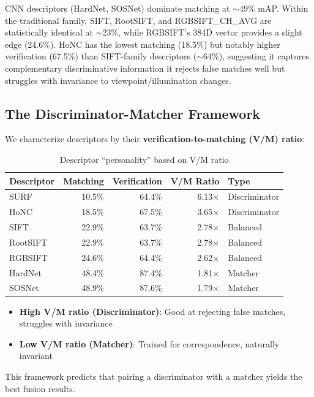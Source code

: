 CNN descriptors (HardNet, SOSNet) dominate matching at $\sim$49\% mAP\@. Within the traditional family, SIFT, RootSIFT, and RGBSIFT\_CH\_AVG are statistically identical at $\sim$23\%, while RGBSIFT's 384D vector provides a slight edge (24.6\%). HoNC has the lowest matching (18.5\%) but notably higher verification (67.5\%) than SIFT-family descriptors ($\sim$64\%), suggesting it captures complementary discriminative information it rejects false matches well but struggles with invariance to viewpoint/illumination changes.

\subsection{The Discriminator-Matcher Framework}

We characterize descriptors by their \textbf{verification-to-matching (V/M) ratio}:

\begin{table}[ht]
\centering
\caption{Descriptor ``personality'' based on V/M ratio}
\label{tab:vm_ratio}
\begin{tabular}{lrrrl}
\toprule
\textbf{Descriptor} & \textbf{Matching} & \textbf{Verification} & \textbf{V/M Ratio} & \textbf{Type} \\
\midrule
SURF & 10.5\% & 64.4\% & 6.13$\times$ & Discriminator \\
HoNC & 18.5\% & 67.5\% & 3.65$\times$ & Discriminator \\
SIFT & 22.9\% & 63.7\% & 2.78$\times$ & Balanced \\
RootSIFT & 22.9\% & 63.7\% & 2.78$\times$ & Balanced \\
RGBSIFT & 24.6\% & 64.4\% & 2.62$\times$ & Balanced \\
HardNet & 48.4\% & 87.4\% & 1.81$\times$ & Matcher \\
SOSNet & 48.9\% & 87.6\% & 1.79$\times$ & Matcher \\
\bottomrule
\end{tabular}
\end{table}

\begin{itemize}
    \item \textbf{High V/M ratio (Discriminator)}: Good at rejecting false matches, struggles with invariance
    \item \textbf{Low V/M ratio (Matcher)}: Trained for correspondence, naturally invariant
\end{itemize}

This framework predicts that pairing a discriminator with a matcher yields the best fusion results.

